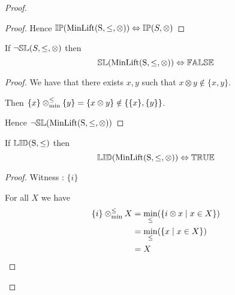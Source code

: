 \begin{proof}
\begin{proof}
\vspace{2em}

Hence ${\mathbb{IP}}(\mathrm{MinLift(S,\leq,\otimes)}) \Leftrightarrow {\mathbb{IP}}(S,\otimes)$
\end{proof}







\begin{theorem} \label{thm:minlift_sl}
If $\neg{\mathbb{SL}}(S,\leq,\otimes)$ then
\begin{equation*}
{\mathbb{SL}}(\mathrm{MinLift(S,\leq,\otimes)}) \Leftrightarrow {\mathbb{FALSE}}
\end{equation*}
\end{theorem}

\begin{proof}

\vspace{0.5em}

We have that there exists $x, y$ such that $x \otimes y \notin \{x , y\}$.

\vspace{0.5em}

Then $\{ x \} \mathbin{\otimes_{\min}^{\leq}} \{ y \} = \{ x \otimes y \} \notin \{ \{ x \}, \{ y \}\}$.

\vspace{0.5em}

Hence $\neg {\mathbb{SL}}(\mathrm{MinLift(S,\leq,\otimes)})$
\end{proof}






\begin{theorem} \label{thm:minlift_lid}
If ${\mathbb{LID}}\mathrm{(S,\leq)}$ then
\begin{equation*}
{\mathbb{LID}}(\mathrm{MinLift(S,\leq,\otimes)}) \Leftrightarrow {\mathbb{TRUE}}
\end{equation*}
\end{theorem}

\begin{proof}

\vspace{0.5em}

Witness : $\{ i \}$

\vspace{0.5em}

For all $X$ we have
\begin{align*}
\{ i \} \mathbin{\otimes_{\min}^{\leq}} X 	& = \min_\leq(\{i \otimes x \mid x \in X\}) \\
					& = \min_\leq(\{x \mid x \in X\}) \\
					& = X
\end{align*}
\end{proof}
\end{proof}





